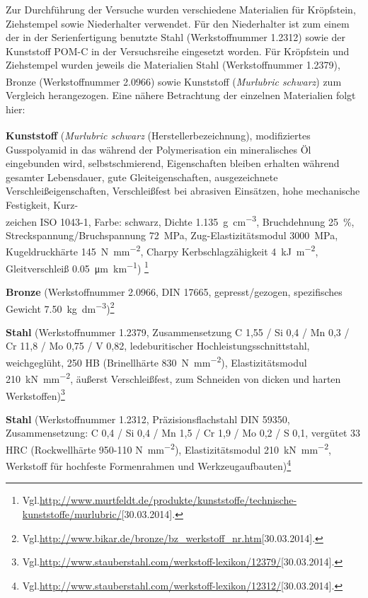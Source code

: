 \documentclass[12pt,a4paper,parskip,twoside,BCOR5mm,headsepline]{scrartcl}
\begin{document}
\begin{description*}
\newpage


Zur Durchführung der Versuche wurden verschiedene Materialien für Kröpfstein, Ziehstempel sowie Niederhalter verwendet. Für den Niederhalter ist zum einem der in der Serienfertigung benutzte Stahl (Werkstoffnummer 1.2312) sowie der Kunststoff POM-C in der Versuchsreihe eingesetzt worden. Für Kröpfstein und Ziehstempel wurden jeweils die Materialien Stahl (Werkstoffnummer 1.2379), Bronze (Werkstoffnummer 2.0966) sowie Kunststoff (\emph{Murlubric\textsuperscript{\textregistered} schwarz}) zum Vergleich herangezogen. Eine nähere Betrachtung der einzelnen Materialien folgt hier:

\begin{itemize*}
\item \textbf{Kunststoff} (\emph{Murlubric\textsuperscript{\textregistered} schwarz} (Herstellerbezeichnung), modifiziertes Gusspolyamid in das während der Polymerisation ein mineralisches Öl eingebunden wird, selbstschmierend, Eigenschaften bleiben erhalten während gesamter Lebensdauer, gute Gleiteigenschaften, ausgezeichnete Verschleißeigenschaften, Verschleißfest bei abrasiven Einsätzen, hohe mechanische Festigkeit, Kurz-\\zeichen ISO 1043-1, Farbe: schwarz, Dichte \SI{1,135}{\gram\per\centi\meter\cubed}, Bruchdehnung \SI{25}{\percent}, Streckspannung/Bruchspannung \SI{72}{\mega\pascal}, Zug-Elastizitätsmodul \SI{3000}{\mega\pascal}, Kugeldruckhärte \SI{145}{\newton\per\milli\meter\squared},  Charpy Kerbschlagzähigkeit
 \SI{4}{\kilo\joule\per\meter\squared}, Gleitverschleiß \SI{0,05}{\micro\meter\per\kilo\meter})
\footnote{Vgl.\url{http://www.murtfeldt.de/produkte/kunststoffe/technische-kunststoffe/murlubric/}[30.03.2014].}
\item \textbf{Bronze} (Werkstoffnummer 2.0966, DIN 17665, gepresst/gezogen, spezifisches Gewicht \SI{7.50}{\kilo\gram\per\deci\meter\cubed})\footnote{Vgl.\url{http://www.bikar.de/bronze/bz_werkstoff_nr.htm}[30.03.2014].}
\item \textbf{Stahl} (Werkstoffnummer 1.2379, Zusammensetzung C 1,55 / Si 0,4 / Mn 0,3 / Cr 11,8 / Mo 0,75 / V 0,82, ledeburitischer Hochleistungsschnittstahl,  weichgeglüht, 250 HB (Brinellhärte \SI{830}{\newton\per\milli\meter\squared}), Elastizitätsmodul  \SI{210}{\kilo\newton\per\milli\meter\squared}, äußerst Verschleißfest, zum Schneiden von dicken und harten Werkstoffen)\footnote{Vgl.\url{http://www.stauberstahl.com/werkstoff-lexikon/12379/}[30.03.2014].}
\item \textbf{Stahl} (Werkstoffnummer 1.2312, Präzisionsflachstahl DIN 59350, Zusammensetzung: C 0,4 / Si 0,4 / Mn 1,5 / Cr 1,9 / Mo 0,2 / S 0,1, vergütet 33 HRC (Rockwellhärte 950-110 \si{\newton\per\milli\meter\squared}), Elastizitätsmodul \SI{210}{\kilo\newton\per\milli\meter\squared}, Werkstoff für hochfeste Formenrahmen und Werkzeugaufbauten)\footnote{Vgl.\url{http://www.stauberstahl.com/werkstoff-lexikon/12312/}[30.03.2014].}

\end{itemize*}
\end{description*}
\end{document}
